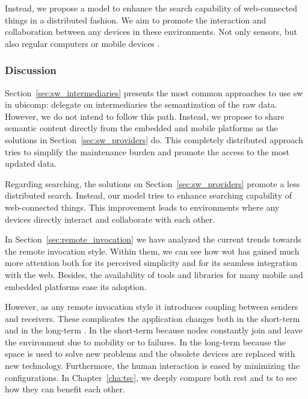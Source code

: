 Instead, we propose a model to enhance the search capability of web-connected things in a distributed fashion.
We aim to promote the interaction and collaboration between any devices in these environments.
Not only sensors, but also regular computers or mobile devices \citep{balandin_access_2011}.



\subsubsection{Discussion}


Section~\ref{sec:sw_intermediaries} presents the most common approaches to use \ac{sw} in \ac{ubicomp}: delegate on intermediaries the semantization of the raw data.
However, we do not intend to follow this path.
Instead, we propose to share semantic content directly from the embedded and mobile platforms as the solutions in Section~\ref{sec:sw_providers} do.
This completely distributed approach tries to simplify the maintenance burden and promote the access to the most updated data.


Regarding searching, the solutions on Section~\ref{sec:sw_providers} promote a less distributed search.
Instead, our model tries to enhance searching capability of web-connected things.
This improvement leads to environments where any devices directly interact and collaborate with each other.



In Section~\ref{sec:remote_invocation} we have analyzed the current trends towards the remote invocation style.
Within them, we can see how \ac{wot} has gained much more attention both for its perceived simplicity and for its seamless integration with the web.
Besides, the availability of tools and libraries for many mobile and embedded platforms ease its adoption.


However, as any remote invocation style it introduces coupling between senders and receivers.
These complicates the application changes both in the short-term and in the long-term \citep{johanson_extending_2004}.
In the short-term because nodes constantly join and leave the environment due to mobility or to failures.
In the long-term because the space is used to solve new problems and the obsolete devices are replaced with new technology.
Furthermore, the human interaction is eased by minimizing the configurations.
In Chapter~\ref{cha:tsc}, we deeply compare both \ac{rest} and \ac{ts} to see how they can benefit each other.